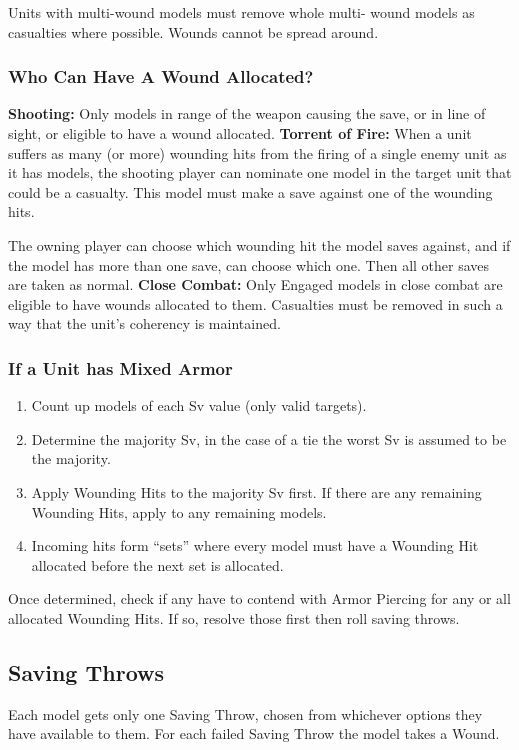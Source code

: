 Units with multi-wound models must remove whole multi-
wound models as casualties where possible. Wounds cannot
be spread around.

\subsubsection{Who Can Have A Wound Allocated?}
{\bfseries Shooting:} Only models in range of the weapon causing the
save, or in line of sight, or eligible to have a wound allocated.
{\bfseries Torrent of Fire:} When a unit suffers as many (or more)
wounding hits from the firing of a single enemy unit as it has
models, the shooting player can nominate one model in the
target unit that could be a casualty. This model must make a
save against one of the wounding hits.

The owning player can choose which wounding hit the model
saves against, and if the model has more than one save, can
choose which one. Then all other saves are taken as normal.
{\bfseries Close Combat:} Only Engaged models in close combat are
eligible to have wounds allocated to them.
Casualties must be removed in such a way that the unit's
coherency is maintained.

\subsubsection{If a Unit has Mixed Armor}
\begin{enumerate}
\item Count up models of each Sv value (only valid targets).
\item  Determine the majority Sv, in the case of a tie the worst
Sv is assumed to be the majority.
\item  Apply Wounding Hits to the majority Sv first. If there are
any remaining Wounding Hits, apply to any remaining
models.
\item  Incoming hits form “sets” where every model must have
a Wounding Hit allocated before the next set is allocated.
\end{enumerate}

Once determined, check if any have to contend with Armor
Piercing for any or all allocated Wounding Hits. If so, resolve
those first then roll saving throws.

\subsection{Saving Throws}
Each model gets only one Saving Throw, chosen from
whichever options they have available to them. For each failed
Saving Throw the model takes a Wound.

